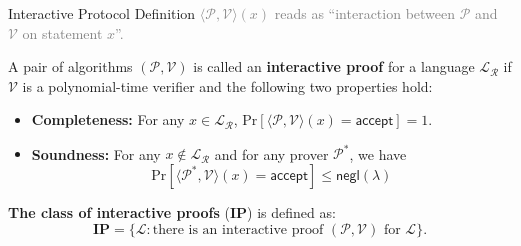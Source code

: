 \documentclass{zkdl-presentation-template}
\begin{document}
    \begin{frame}{Interactive Protocol Definition}
        \textcolor{gray}{$\langle \mathcal{P}, \mathcal{V} \rangle(x)$ reads as ``interaction between $\mathcal{P}$ and $\mathcal{V}$ on statement $x$''.}

        \begin{definition}
            A pair of algorithms $(\mathcal{P},\mathcal{V})$ is called an \textbf{interactive proof} for a language $\mathcal{L}_{\mathcal{R}}$ if $\mathcal{V}$ is a polynomial-time verifier and the following two properties hold:
            \begin{itemize}
                \item \textbf{Completeness:} For any $x \in \mathcal{L}_{\mathcal{R}}$, $\text{Pr}[\langle \mathcal{P}, \mathcal{V} \rangle(x) = \mathsf{accept}]=1$.
                \item \textbf{Soundness:} For any $x \not\in \mathcal{L}_{\mathcal{R}}$ and for any prover $\mathcal{P}^*$, we have 
                \begin{equation*}
                    \text{Pr}[\langle \mathcal{P}^*, \mathcal{V} \rangle(x) = \mathsf{accept}] \leq \mathsf{negl}(\lambda)
                \end{equation*}
            \end{itemize}
        \end{definition}

        \begin{definition}
            \textbf{The class of interactive proofs} (\textbf{IP}) is defined as:
            \begin{equation*}
                \mathbf{IP} = \{\mathcal{L}: \text{there is an interactive proof $(\mathcal{P}, \mathcal{V})$ for $\mathcal{L}$}\}.
            \end{equation*}
        \end{definition}
    \end{frame}
\end{document}
